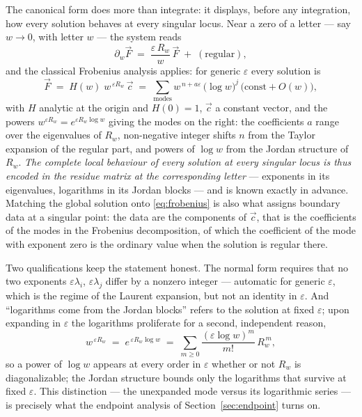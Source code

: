 \documentclass[11pt]{article}
\newcommand{\eps}{\varepsilon}
\begin{document}
The canonical form does more than integrate: it displays, before any
integration, how every solution behaves at every singular locus.
Near a zero of a letter --- say $w \to 0$, with letter $w$ --- the
system reads
\begin{equation}
  \partial_w \vec F \;=\; \frac{\eps\,R_{w}}{w}\,\vec F
  \;+\; (\text{regular}) ,
\end{equation}
and the classical Frobenius analysis applies: for generic $\eps$ every
solution is
\begin{equation}
  \vec F \;=\; H(w)\;w^{\,\eps R_w}\,\vec c
  \;=\; \sum_{\text{modes}} w^{\,n + a\eps}\,\big(\log w\big)^{j}\,
  \big(\text{const} + O(w)\big) ,
  \label{eq:frobenius}
\end{equation}
with $H$ analytic at the origin and $H(0) = 1$, $\vec c$ a constant
vector, and the powers $w^{\eps R_w} = e^{\eps R_w \log w}$ giving the
modes on the right: the coefficients $a$ range over the eigenvalues of
$R_w$,
non-negative integer shifts $n$ from the Taylor expansion of the
regular part, and powers of $\log w$ from the Jordan structure of
$R_w$.  \emph{The complete local behaviour of every solution at
every singular locus is thus encoded in the residue matrix at the
corresponding letter} --- exponents in its eigenvalues, logarithms
in its Jordan blocks --- and is known exactly in advance.  Matching
the global solution onto \eqref{eq:frobenius} is also what assigns
boundary data at a singular point: the data are the components of
$\vec c$, that is the coefficients of the modes in the Frobenius
decomposition, of which the coefficient of the mode with exponent
zero is the ordinary value when the solution is regular there.

Two qualifications keep the statement honest.  The normal form
requires that no two exponents $\eps\lambda_i$, $\eps\lambda_j$
differ by a nonzero integer --- automatic for generic $\eps$, which
is the regime of the Laurent expansion, but not an identity in
$\eps$.  And ``logarithms come from the Jordan blocks'' refers to
the solution at fixed $\eps$; upon expanding in $\eps$ the
logarithms proliferate for a second, independent reason,
\begin{equation}
  w^{\,\eps R_w} \;=\; e^{\,\eps R_w \log w}
  \;=\; \sum_{m \ge 0} \frac{(\eps \log w)^m}{m!}\, R_w^{\,m} ,
\end{equation}
so a power of $\log w$ appears at every order in $\eps$ whether or
not $R_w$ is diagonalizable; the Jordan structure bounds only the
logarithms that survive at fixed $\eps$.  This distinction --- the
unexpanded mode versus its logarithmic series --- is precisely what
the endpoint analysis of Section~\ref{sec:endpoint} turns on.
\end{document}
